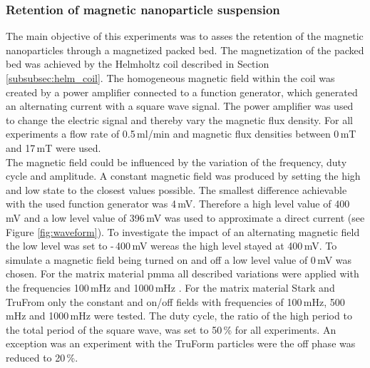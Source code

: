 \subsubsection{Retention of magnetic nanoparticle suspension}
\label{subsubsec:Ret_nanopart_method}
The main objective of this experiments was to asses the retention of the magnetic nanoparticles through a magnetized packed bed. The magnetization of the packed bed was achieved by the Helmholtz coil described in Section \ref{subsubsec:helm_coil}. The homogeneous magnetic field within the coil was created by a power amplifier connected to a function generator, which generated an alternating current with a square wave signal. The power amplifier was used to change the electric signal and thereby vary the magnetic flux density. For all experiments a flow rate of 0.5\,ml/min and magnetic flux densities between 0\,mT and 17\,mT were used. \\
The magnetic field could be influenced by the variation of the frequency, duty cycle and amplitude. A constant magnetic field was produced by setting the high and low state to the closest values possible. The smallest difference achievable with the used function generator was 4\,mV. Therefore a high level value of 400\,mV and a low level value of 396\,mV was used to approximate a direct current (see Figure \ref{fig:waveform}). To investigate the impact of an alternating magnetic field the low level was set to -\,400\,mV wereas the high level stayed at 400\,mV. To simulate a magnetic field being turned on and off a low level value of 0\,mV was chosen. For the matrix material \gls{pmma} all described variations were applied with the frequencies 100\,mHz and 1000\,mHz . For the matrix material Stark and TruFrom only the constant and on/off fields with frequencies of 100\,mHz, 500\,mHz and 1000\,mHz were tested. The duty cycle, the ratio of the high period to the total period of the square wave, was set to 50\,\% for all experiments. An exception was an experiment with the TruForm particles were the off phase was reduced to 20\,\%.


